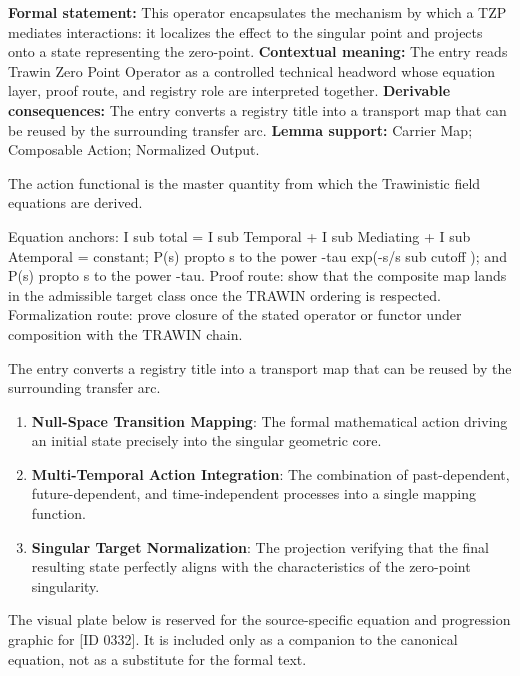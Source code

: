 \begingroup\footnotesize\setlength{\emergencystretch}{3em}\sloppy
\textbf{Formal statement:} This operator encapsulates the mechanism by which a TZP mediates interactions: it localizes the effect to the singular point and projects onto a state representing the zero-point. \textbf{Contextual meaning:} The entry reads Trawin Zero Point Operator as a controlled technical headword whose equation layer, proof route, and registry role are interpreted together. \textbf{Derivable consequences:} The entry converts a registry title into a transport map that can be reused by the surrounding transfer arc. \textbf{Lemma support:} Carrier Map; Composable Action; Normalized Output.\par
\endgroup

The action functional is the master quantity from which the Trawinistic field equations are derived.

Equation anchors: I sub total = I sub Temporal + I sub Mediating + I sub Atemporal = constant; P(s) propto s to the power -tau exp(-s/s sub cutoff ); and P(s) propto s to the power -tau. Proof route: show that the composite map lands in the admissible target class once the TRAWIN ordering is respected. Formalization route: prove closure of the stated operator or functor under composition with the TRAWIN chain.

The entry converts a registry title into a transport map that can be reused by the surrounding transfer arc.
\endgroup

\begin{enumerate}[leftmargin=1.6em,itemsep=6pt,topsep=4pt]
\item \textbf{Null-Space Transition Mapping}: The formal mathematical action driving an initial state precisely into the singular geometric core.
\item \textbf{Multi-Temporal Action Integration}: The combination of past-dependent, future-dependent, and time-independent processes into a single mapping function.
\item \textbf{Singular Target Normalization}: The projection verifying that the final resulting state perfectly aligns with the characteristics of the zero-point singularity.
\end{enumerate}

\begingroup\footnotesize\sloppy
The visual plate below is reserved for the source-specific equation and progression graphic for [ID 0332]. It is included only as a companion to the canonical equation, not as a substitute for the formal text.
\par\endgroup
\ifTZPDarkEdition
{}
\fi

